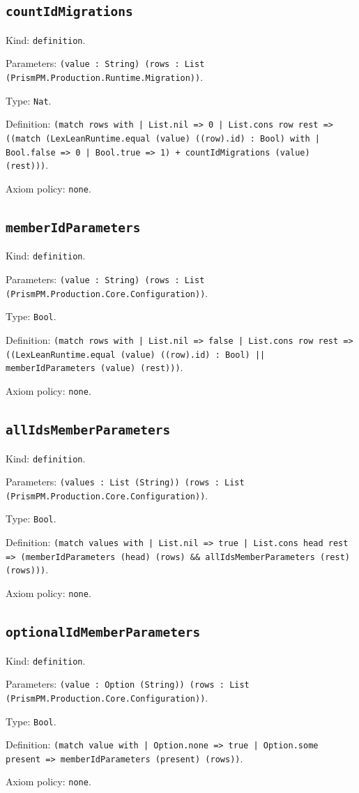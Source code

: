 \documentclass[11pt]{article}
\begin{document}
\subsection*{\texttt{countIdMigrations}}
\noindent Kind: \texttt{definition}.\par
\noindent Parameters: \texttt{(value : String) (rows : List (PrismPM.Production.Runtime.Migration))}.\par
\noindent Type: \texttt{Nat}.\par
\noindent Definition: \texttt{(match rows with | List.nil => 0 | List.cons row rest => ((match (LexLeanRuntime.equal (value) ((row).id) : Bool) with | Bool.false => 0 | Bool.true => 1) + countIdMigrations (value) (rest)))}.\par
\noindent Axiom policy: \texttt{none}.\par
\subsection*{\texttt{memberIdParameters}}
\noindent Kind: \texttt{definition}.\par
\noindent Parameters: \texttt{(value : String) (rows : List (PrismPM.Production.Core.Configuration))}.\par
\noindent Type: \texttt{Bool}.\par
\noindent Definition: \texttt{(match rows with | List.nil => false | List.cons row rest => ((LexLeanRuntime.equal (value) ((row).id) : Bool) || memberIdParameters (value) (rest)))}.\par
\noindent Axiom policy: \texttt{none}.\par
\subsection*{\texttt{allIdsMemberParameters}}
\noindent Kind: \texttt{definition}.\par
\noindent Parameters: \texttt{(values : List (String)) (rows : List (PrismPM.Production.Core.Configuration))}.\par
\noindent Type: \texttt{Bool}.\par
\noindent Definition: \texttt{(match values with | List.nil => true | List.cons head rest => (memberIdParameters (head) (rows) \&\& allIdsMemberParameters (rest) (rows)))}.\par
\noindent Axiom policy: \texttt{none}.\par
\subsection*{\texttt{optionalIdMemberParameters}}
\noindent Kind: \texttt{definition}.\par
\noindent Parameters: \texttt{(value : Option (String)) (rows : List (PrismPM.Production.Core.Configuration))}.\par
\noindent Type: \texttt{Bool}.\par
\noindent Definition: \texttt{(match value with | Option.none => true | Option.some present => memberIdParameters (present) (rows))}.\par
\noindent Axiom policy: \texttt{none}.\par
\end{document}
